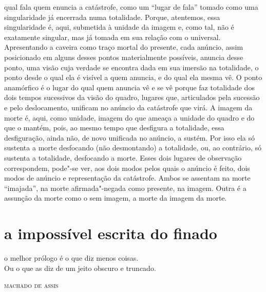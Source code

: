 qual fala quem enuncia a catástrofe, como um ``lugar de fala'' tomado
como uma singularidade já encerrada numa totalidade. Porque, atentemos,
essa singularidade é, aqui, submetida à unidade da imagem e, como tal,
não é exatamente singular, mas já tomada em sua relação com o universal.
Apresentando a caveira como traço mortal do presente, cada anúncio,
assim posicionado em alguns desses pontos materialmente possíveis,
anuncia desse ponto, uma visão cuja verdade se encontra dada em sua
imersão na totalidade, o ponto desde o qual ela é visível a quem
anuncia, e do qual ela mesma vê. O ponto anamórfico é o lugar do qual
quem anuncia vê e se vê porque faz totalidade dos dois tempos sucessivos
da visão do quadro, lugares que, articulados pela sucessão e pelo
deslocamento, unificam no anúncio da catástrofe que virá. A imagem da
morte é, aqui, como unidade, imagem do que ameaça a unidade do quadro e
do que o mantém, pois, ao mesmo tempo que desfigura a totalidade, essa
desfiguração, ainda não, de novo unificada no anúncio, a sustém. Por
isso ela só sustenta a morte desfocando (não desmontando) a totalidade,
ou, ao contrário, só sustenta a totalidade, desfocando a morte. Esses
dois lugares de observação correspondem, pode"-se ver, aos dois modos
pelos quais o anúncio é feito, dois modos de anúncio e representação da
catástrofe. Ambos se assentam na morte ``imajada'', na morte
afirmada"-negada como presente, na imagem. Outra é a assunção da morte
como o sem imagem, a morte da imagem da morte.

\section{a impossível escrita do finado}

\epigraph{o melhor prólogo é o que diz menos coisas.\\
Ou o que as diz de um jeito obscuro e truncado.}{\textsc{machado de assis}}

